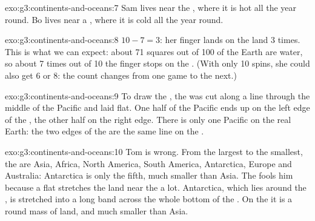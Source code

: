 \begin{solution}{exo:g3:continents-and-oceans:7}
Sam lives near the , where it is hot all the year round. Bo lives
near a , where it is cold all the year round.
\end{solution}

\begin{solution}{exo:g3:continents-and-oceans:8}
$10 - 7 = 3$: her finger lands on the land 3 times. This is what we can
expect: about 71 squares out of 100 of the Earth are water, so about 7 times
out of 10 the finger stops on the . (With only 10 spins, she could also
get 6 or 8: the count changes from one game to the next.)
\end{solution}

\begin{solution}{exo:g3:continents-and-oceans:9}
To draw the , the  was cut along a line through the middle of
the Pacific  and laid flat. One half of the Pacific ends up on the
left edge of the , the other half on the right edge. There is only one
Pacific  on the real Earth: the two edges of the  are the same
line on the .
\end{solution}

\begin{solution}{exo:g3:continents-and-oceans:10}
Tom is wrong. From the largest to the smallest, the  are Asia,
Africa, North America, South America, Antarctica, Europe and Australia:
Antarctica is only the fifth, much smaller than Asia. The  fools
him because a flat  stretches the land near the  a lot.
Antarctica, which lies around the , is stretched into a long band
across the whole bottom of the . On the  it is a round mass of
land, and much smaller than Asia.
\end{solution}
